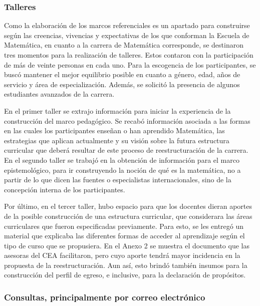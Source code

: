 \subsubsection{Talleres}

Como la elaboración de los marcos referenciales es un apartado para construirse según las creencias, vivencias y expectativas de los que conforman la Escuela de Matemática, en cuanto a la carrera de Matemática corresponde, se destinaron tres momentos para la realización de talleres. Estos contaron con la participación de más de veinte personas en cada uno. Para la escogencia de los participantes, se buscó mantener el mejor equilibrio posible en cuanto a género, edad, años de servicio y área de especialización. Además, se solicitó la presencia de algunos estudiantes avanzados de la carrera. 

En el primer taller se extrajo información para iniciar la experiencia de la construcción del marco pedagógico. Se recabó información asociada a las formas en las cuales los participantes enseñan o han aprendido Matemática, las estrategias que aplican actualmente y su visión sobre la futura estructura curricular que deberá resultar de este proceso de reestructuración de la carrera. En el segundo taller se trabajó en la obtención de información para el marco epistemológico, para ir construyendo la noción de qué es la matemática, no a partir de lo que dicen las fuentes o especialistas internacionales, sino de la concepción interna de los participantes.

Por último, en el tercer taller, hubo espacio para que los docentes dieran aportes de la posible construcción de una estructura curricular, que considerara las áreas curriculares que fueron especificadas previamente. Para esto, se les entregó un material que explicaba las diferentes formas de acceder al aprendizaje según el tipo de curso que se propusiera. En el Anexo 2 se muestra el documento que las asesoras del CEA facilitaron, pero cuyo aporte tendrá mayor incidencia en la propuesta de la reestructuración. Aun así, esto brindó también insumos para la construcción del perfil de egreso, e inclusive, para la declaración de propósitos. 

\subsubsection{Consultas, principalmente por correo electrónico}

